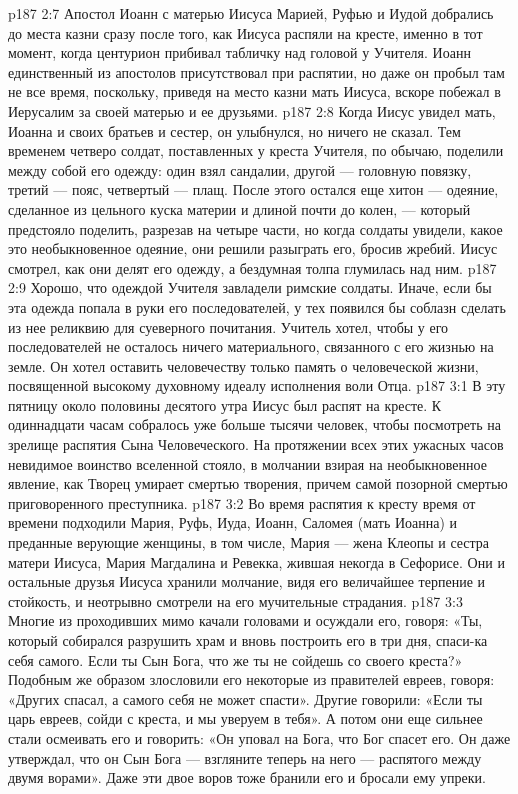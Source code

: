 \vs p187 2:7 Апостол Иоанн с матерью Иисуса Марией, Руфью и Иудой добрались до места казни сразу после того, как Иисуса распяли на кресте, именно в тот момент, когда центурион прибивал табличку над головой у Учителя. Иоанн единственный из апостолов присутствовал при распятии, но даже он пробыл там не все время, поскольку, приведя на место казни мать Иисуса, вскоре побежал в Иерусалим за своей матерью и ее друзьями.
\vs p187 2:8 Когда Иисус увидел мать, Иоанна и своих братьев и сестер, он улыбнулся, но ничего не сказал. Тем временем четверо солдат, поставленных у креста Учителя, по обычаю, поделили между собой его одежду: один взял сандалии, другой --- головную повязку, третий --- пояс, четвертый --- плащ. После этого остался еще хитон --- одеяние, сделанное из цельного куска материи и длиной почти до колен, --- который предстояло поделить, разрезав на четыре части, но когда солдаты увидели, какое это необыкновенное одеяние, они решили разыграть его, бросив жребий. Иисус смотрел, как они делят его одежду, а бездумная толпа глумилась над ним.
\vs p187 2:9 \pc Хорошо, что одеждой Учителя завладели римские солдаты. Иначе, если бы эта одежда попала в руки его последователей, у тех появился бы соблазн сделать из нее реликвию для суеверного почитания. Учитель хотел, чтобы у его последователей не осталось ничего материального, связанного с его жизнью на земле. Он хотел оставить человечеству только память о человеческой жизни, посвященной высокому духовному идеалу исполнения воли Отца.
\vs p187 3:1 В эту пятницу около половины десятого утра Иисус был распят на кресте. К одиннадцати часам собралось уже больше тысячи человек, чтобы посмотреть на зрелище распятия Сына Человеческого. На протяжении всех этих ужасных часов невидимое воинство вселенной стояло, в молчании взирая на необыкновенное явление, как Творец умирает смертью творения, причем самой позорной смертью приговоренного преступника.
\vs p187 3:2 Во время распятия к кресту время от времени подходили Мария, Руфь, Иуда, Иоанн, Саломея (мать Иоанна) и преданные верующие женщины, в том числе, Мария --- жена Клеопы и сестра матери Иисуса, Мария Магдалина и Ревекка, жившая некогда в Сефорисе. Они и остальные друзья Иисуса хранили молчание, видя его величайшее терпение и стойкость, и неотрывно смотрели на его мучительные страдания.
\vs p187 3:3 Многие из проходивших мимо качали головами и осуждали его, говоря: «Ты, который собирался разрушить храм и вновь построить его в три дня, спаси\hyp{}ка себя самого. Если ты Сын Бога, что же ты не сойдешь со своего креста?» Подобным же образом злословили его некоторые из правителей евреев, говоря: «Других спасал, а самого себя не может спасти». Другие говорили: «Если ты царь евреев, сойди с креста, и мы уверуем в тебя». А потом они еще сильнее стали осмеивать его и говорить: «Он уповал на Бога, что Бог спасет его. Он даже утверждал, что он Сын Бога --- взгляните теперь на него --- распятого между двумя ворами». Даже эти двое воров тоже бранили его и бросали ему упреки.
